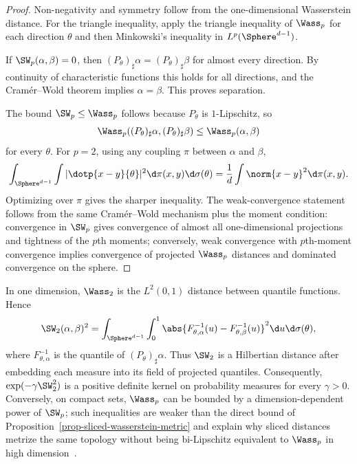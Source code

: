 \begin{proof}
	Non-negativity and symmetry follow from the one-dimensional Wasserstein distance. For the triangle inequality, apply the triangle inequality of $\Wass_p$ for each direction $\theta$ and then Minkowski's inequality in $L^p(\Sphere^{d-1})$.

	If $\SW_p(\alpha,\beta)=0$, then $(P_\theta)_\sharp\alpha=(P_\theta)_\sharp\beta$ for almost every direction. By continuity of characteristic functions this holds for all directions, and the Cram\'er--Wold theorem implies $\alpha=\beta$. This proves separation.

	The bound $\SW_p\leq\Wass_p$ follows because $P_\theta$ is $1$-Lipschitz, so
	\[
		\Wass_p((P_\theta)_\sharp\alpha,(P_\theta)_\sharp\beta)
		\leq
		\Wass_p(\alpha,\beta)
	\]
	for every $\theta$. For $p=2$, using any coupling $\pi$ between $\alpha$ and $\beta$,
	\[
		\int_{\Sphere^{d-1}}\int |\dotp{x-y}{\theta}|^2\d\pi(x,y)\d\sigma(\theta)
		=
		\frac1d\int\norm{x-y}^2\d\pi(x,y).
	\]
	Optimizing over $\pi$ gives the sharper inequality. The weak-convergence statement follows from the same Cram\'er--Wold mechanism plus the moment condition: convergence in $\SW_p$ gives convergence of almost all one-dimensional projections and tightness of the $p$th moments; conversely, weak convergence with $p$th-moment convergence implies convergence of projected $\Wass_p$ distances and dominated convergence on the sphere.
\end{proof}

\begin{rem}\label{rem-sliced-hilbert-embedding}
	In one dimension, $\Wass_2$ is the $L^2(0,1)$ distance between quantile functions. Hence
	\[
		\SW_2(\alpha,\beta)^2
		=
		\int_{\Sphere^{d-1}}\int_0^1
		\abs{F_{\theta,\alpha}^{-1}(u)-F_{\theta,\beta}^{-1}(u)}^2
		\d u\d\sigma(\theta),
	\]
	where $F_{\theta,\alpha}^{-1}$ is the quantile of $(P_\theta)_\sharp\alpha$. Thus $\SW_2$ is a Hilbertian distance after embedding each measure into its field of projected quantiles. Consequently, $\exp(-\gamma\SW_2^2)$ is a positive definite kernel on probability measures for every $\gamma>0$.
	Conversely, on compact sets, $\Wass_p$ can be bounded by a dimension-dependent power of $\SW_p$; such inequalities are weaker than the direct bound of Proposition~\ref{prop-sliced-wasserstein-metric} and explain why sliced distances metrize the same topology without being bi-Lipschitz equivalent to $\Wass_p$ in high dimension~\cite{bonnotte2013unidimensional,nadjahi2019asymptotic}.
\end{rem}

